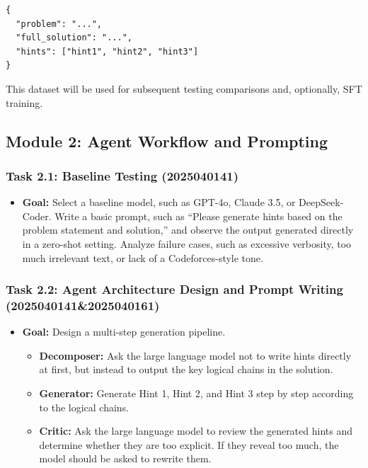 \documentclass{article}
\begin{document}
\begin{verbatim}
{
  "problem": "...",
  "full_solution": "...",
  "hints": ["hint1", "hint2", "hint3"]
}
\end{verbatim}

This dataset will be used for subsequent testing comparisons and, optionally, SFT training.

\subsection*{Module 2: Agent Workflow and Prompting}


\subsubsection*{Task 2.1: Baseline Testing (2025040141)}

\begin{itemize}
    \item \textbf{Goal:} Select a baseline model, such as GPT-4o, Claude 3.5, or DeepSeek-Coder. Write a basic prompt, such as ``Please generate hints based on the problem statement and solution,'' and observe the output generated directly in a zero-shot setting. Analyze failure cases, such as excessive verbosity, too much irrelevant text, or lack of a Codeforces-style tone.
\end{itemize}

\subsubsection*{Task 2.2: Agent Architecture Design and Prompt Writing (2025040141\&2025040161)}

\begin{itemize}
    \item \textbf{Goal:} Design a multi-step generation pipeline.
    \begin{itemize}
        \item \textbf{Decomposer:} Ask the large language model not to write hints directly at first, but instead to output the key logical chains in the solution.
        \item \textbf{Generator:} Generate Hint 1, Hint 2, and Hint 3 step by step according to the logical chains.
        \item \textbf{Critic:} Ask the large language model to review the generated hints and determine whether they are too explicit. If they reveal too much, the model should be asked to rewrite them.
    \end{itemize}
\end{itemize}
\end{document}
